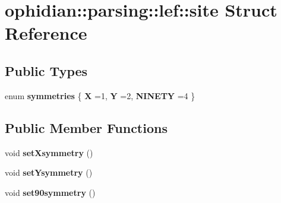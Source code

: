 \hypertarget{structophidian_1_1parsing_1_1lef_1_1site}{\section{ophidian\-:\-:parsing\-:\-:lef\-:\-:site Struct Reference}
\label{structophidian_1_1parsing_1_1lef_1_1site}
}
\subsection*{Public Types}
\begin{DoxyCompactItemize}
\item 
enum {\bfseries symmetries} \{ {\bfseries X} =1, 
{\bfseries Y} =2, 
{\bfseries N\-I\-N\-E\-T\-Y} =4
 \}
\end{DoxyCompactItemize}
\subsection*{Public Member Functions}
\begin{DoxyCompactItemize}
\item 
\hypertarget{structophidian_1_1parsing_1_1lef_1_1site_a5d63610185e58afad1749ba82d509e88}{void {\bfseries set\-Xsymmetry} ()}\label{structophidian_1_1parsing_1_1lef_1_1site_a5d63610185e58afad1749ba82d509e88}

\item 
\hypertarget{structophidian_1_1parsing_1_1lef_1_1site_a8ed609236015865fb7b8dabf941cf12d}{void {\bfseries set\-Ysymmetry} ()}\label{structophidian_1_1parsing_1_1lef_1_1site_a8ed609236015865fb7b8dabf941cf12d}

\item 
\hypertarget{structophidian_1_1parsing_1_1lef_1_1site_a04135ba80bed31ca63697d2cfaa2282e}{void {\bfseries set90symmetry} ()}\label{structophidian_1_1parsing_1_1lef_1_1site_a04135ba80bed31ca63697d2cfaa2282e}

\end{DoxyCompactItemize}
